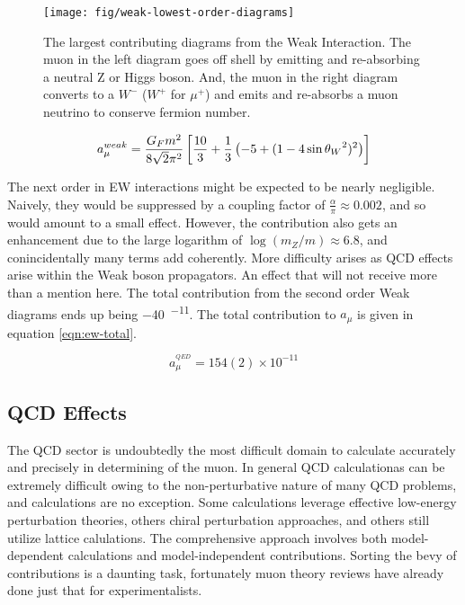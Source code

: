 \begin{figure}
\label{fig:weak-lowest-order-diagrams}
\centering
\texttt{[image: fig/weak-lowest-order-diagrams]}
\caption{The largest contributing diagrams from the Weak Interaction.  The muon in the left diagram goes off shell by emitting and re-absorbing a neutral Z or Higgs boson.  And, the muon in the right diagram converts to a $W^{-}$ ($W^{+}$ for $\mu^{+}$) and emits and re-absorbs a muon neutrino to conserve fermion number.}
\end{figure}

\begin{equation}
\label{eqn:weak-lowest-order}
a_\mu^{weak} = \frac{G_F m^2}{8\sqrt{2}\pi^2} \\
\left[\frac{10}{3} + \frac{1}{3} \left(-5 + (1 - 4\sin{\theta_W}^2)^2 \right) \right]
\end{equation}

The next order in EW interactions might be expected to be nearly negligible.  Naively, they would be suppressed by a coupling factor of $\frac{\alpha}{\pi} \approx 0.002$, and so would amount to a small effect.  However, the contribution also gets an enhancement due to the large logarithm of $\log(m_Z/m) \approx 6.8$, and conincidentally many terms add coherently.  More difficulty arises as QCD effects arise within the Weak boson propagators.  An effect that will not receive more than a mention here.  The total contribution from the second order Weak diagrams ends up being \SI{-40}{^{-11}}\cite{the-muon-g-2}.  The total contribution to $a_\mu$ is given in equation \ref{eqn:ew-total}. 

\begin{equation}
\label{eqn:ew-total}
a_\mu^{^{QED}} = 154(2) \times 10^{-11}
\end{equation}

\subsection{QCD Effects} \label{s-sec:theory-qcd}

The QCD sector is undoubtedly the most difficult domain to calculate accurately and precisely in determining \gmtwo of the muon.  In general QCD calculationas can be extremely difficult owing to the non-perturbative nature of many QCD problems, and \mugmtwo calculations are no exception.  Some calculations leverage effective low-energy perturbation theories, others chiral perturbation approaches, and others still utilize lattice calulations\cite{the-muon-g-2}.  The comprehensive approach involves both model-dependent calculations and model-independent contributions.  Sorting the bevy of contributions is a daunting task, fortunately muon \gmtwo theory reviews have already done just that for experimentalists.


